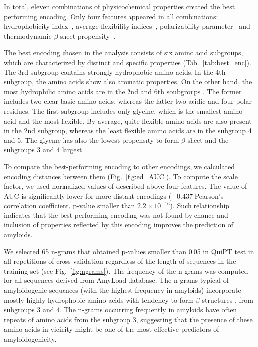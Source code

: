 \documentclass[a4,center,fleqn]{NAR}
\begin{document}
%
%
%

  In total, eleven combinations of physicochemical properties created the best 
performing encoding. Only four features appeared in all combinations: hydrophobicity index~\citep{argos_structural_1982}, average flexibility indices~\citep{bhaskaran_positional_1988}, polarizability 
parameter~\citep{charton_structural_1982} and thermodynamic $\beta$-sheet propensity~\citep{kim_thermodynamic_1993}.

The best encoding chosen in the analysis consists of six amino acid subgroups, which are characterized by distinct and specific properties (Tab.~\ref{tab:best_enc}). The 3rd subgroup contains strongly hydrophobic amino acids. In the 4th subgroup, the amino acids show also aromatic properties. On the other hand, the most hydrophilic amino acids are in the 2nd and 6th soubgroups . The former includes two clear basic amino acids, whereas the latter two acidic and four polar residues. The first subgroup includes only glycine, which is the smallest amino acid and the most flexible.  By average, quite flexible amino acids are also present in the 2nd subgroup, whereas the least flexible amino acids are in the subgroup 4 and 5. The glycine has also the lowest propensity to form $\beta$-sheet and the subgroups 3 and 4 largest.

To compare  the best-performing encoding to other encodings, we calculated encoding distances between  them (Fig.~\ref{fig:ed_AUC}). To compute the scale 
factor, we used normalized values of described above four features. The value of AUC is significantly lower for more distant encodings ($-0.437$ Pearson's correlation coefficient, p-value smaller than $2.2 \times 10^{-16}$). Such relationship indicates that the best-performing encoding was not found by chance and inclusion of properties reflected by this encoding improves the prediction of amyloids.

  We selected 65 n-grams that obtained p-values smaller than 0.05 in QuiPT test in all repetitions of cross-validation regardless of the length of sequences in the training set (see Fig.~\ref{fig:ngrams}). The frequency of the n-grams was computed for all sequences derived from AmyLoad database. The n-grams typical of amyloidogenic sequences (with the highest frequency in amyloids) incorporate 
mostly highly hydrophobic amino acids with tendency to form $\beta$-structures , from 
subgroups 3 and 4. The n-grams occurring frequently in amyloids have often 
 repeats of amino acids from the subgroup 3, suggesting that the presence of these amino acids in vicinity might be one of the most effective predictors of amyloidogenicity.
\end{document}
